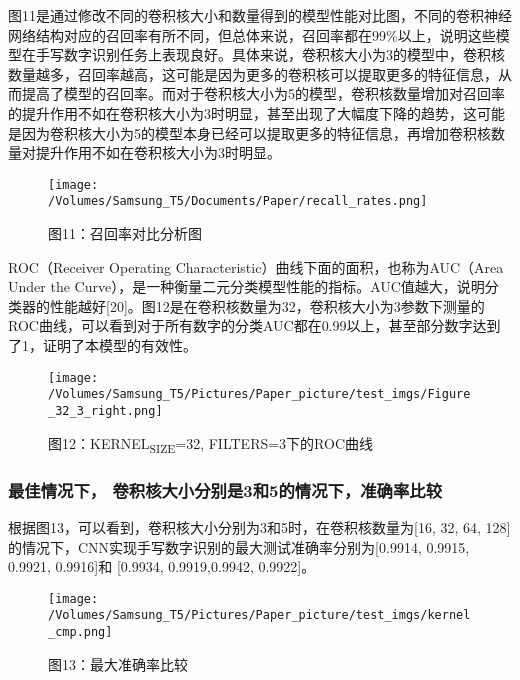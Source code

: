 \documentclass[11pt]{article}
\begin{document}
图11是通过修改不同的卷积核大小和数量得到的模型性能对比图，不同的卷积神经网络结构对应的召回率有所不同，但总体来说，召回率都在99\%以上，说明这些模型在手写数字识别任务上表现良好。具体来说，卷积核大小为3的模型中，卷积核数量越多，召回率越高，这可能是因为更多的卷积核可以提取更多的特征信息，从而提高了模型的召回率。而对于卷积核大小为5的模型，卷积核数量增加对召回率的提升作用不如在卷积核大小为3时明显，甚至出现了大幅度下降的趋势，这可能是因为卷积核大小为5的模型本身已经可以提取更多的特征信息，再增加卷积核数量对提升作用不如在卷积核大小为3时明显。
\begin{figure}[htbp]
\centering
\texttt{[image: /Volumes/Samsung\_T5/Documents/Paper/recall\_rates.png]}
\caption{图11：召回率对比分析图}
\end{figure}


ROC（Receiver Operating Characteristic）曲线下面的面积，也称为AUC（Area Under the Curve），是一种衡量二元分类模型性能的指标。AUC值越大，说明分类器的性能越好[20]。图12是在卷积核数量为32，卷积核大小为3参数下测量的ROC曲线，可以看到对于所有数字的分类AUC都在0.99以上，甚至部分数字达到了1，证明了本模型的有效性。
\begin{figure}[htbp]
\centering
\texttt{[image: /Volumes/Samsung\_T5/Pictures/Paper\_picture/test\_imgs/Figure\_32\_3\_right.png]}
\caption{图12：KERNEL\textsubscript{SIZE}=32, FILTERS=3下的ROC曲线}
\end{figure}

\subsubsection{最佳情况下， 卷积核大小分别是3和5的情况下，准确率比较}
\label{sec:orgede8b10}
根据图13，可以看到，卷积核大小分别为3和5时，在卷积核数量为[16, 32, 64, 128]的情况下，CNN实现手写数字识别的最大测试准确率分别为[0.9914, 0.9915, 0.9921, 0.9916]和 [0.9934, 0.9919,0.9942, 0.9922]。
\begin{figure}[htbp]
\centering
\texttt{[image: /Volumes/Samsung\_T5/Pictures/Paper\_picture/test\_imgs/kernel\_cmp.png]}
\caption{图13：最大准确率比较}
\end{figure}
\end{document}
